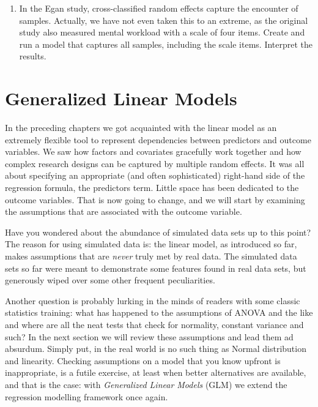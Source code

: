\documentclass[]{svmono}
\providecommand{\tightlist}{%
  \setlength{\itemsep}{0pt}\setlength{\parskip}{0pt}}
\theoremstyle{definition}
\theoremstyle{definition}
\theoremstyle{definition}
\theoremstyle{remark}
\begin{document}
\begin{enumerate}
\def\labelenumi{\arabic{enumi}.}
\tightlist
\item
  In the Egan study, cross-classified random effects capture the
  encounter of samples. Actually, we have not even taken this to an
  extreme, as the original study also measured mental workload with a
  scale of four items. Create and run a model that captures all samples,
  including the scale items. Interpret the results.
\end{enumerate}

\chapter{Generalized Linear Models}\label{GLM}

In the preceding chapters we got acquainted with the linear model as an
extremely flexible tool to represent dependencies between predictors and
outcome variables. We saw how factors and covariates gracefully work
together and how complex research designs can be captured by multiple
random effects. It was all about specifying an appropriate (and often
sophisticated) right-hand side of the regression formula, the predictors
term. Little space has been dedicated to the outcome variables. That is
now going to change, and we will start by examining the assumptions that
are associated with the outcome variable.

Have you wondered about the abundance of simulated data sets up to this
point? The reason for using simulated data is: the linear model, as
introduced so far, makes assumptions that are \emph{never} truly met by
real data. The simulated data sets so far were meant to demonstrate some
features found in real data sets, but generously wiped over some other
frequent peculiarities.

Another question is probably lurking in the minds of readers with some
classic statistics training: what has happened to the assumptions of
ANOVA and the like and where are all the neat tests that check for
normality, constant variance and such? In the next section we will
review these assumptions and lead them ad absurdum. Simply put, in the
real world is no such thing as Normal distribution and linearity.
Checking assumptions on a model that you know upfront is inappropriate,
is a futile exercise, at least when better alternatives are available,
and that is the case: with \emph{Generalized Linear Models} (GLM) we
extend the regression modelling framework once again.
\end{document}
